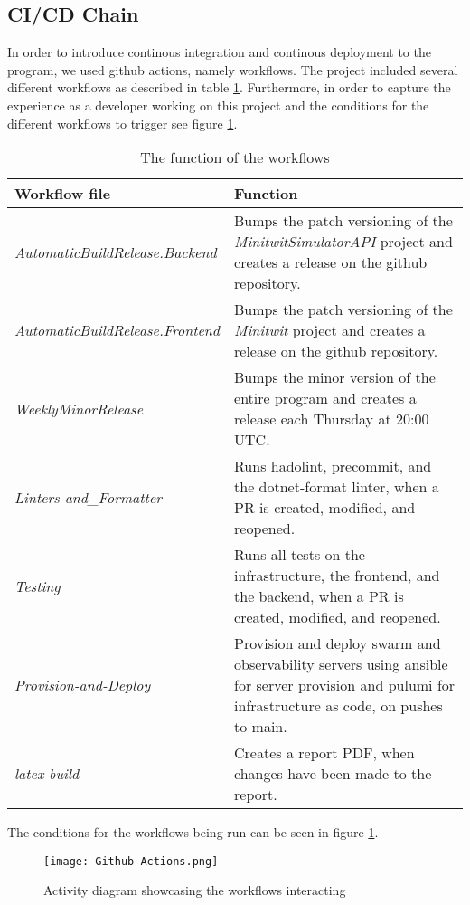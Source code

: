 \subsection{CI/CD Chain} %

In order to introduce continous integration and continous deployment to the program, we used github actions, namely workflows. The project included several different workflows as described in table \ref{tab:workflows}. Furthermore, in order to capture the experience as a developer working on this project and the conditions for the different workflows to trigger see figure \ref{fig:workflows}.

\begin{table}[]
    \centering
    \begin{tabular}{l|l}
        \textbf{Workflow file} & \textbf{Function}\\
        \hline
        \textit{AutomaticBuildRelease.Backend} &  Bumps the patch versioning of the \textit{MinitwitSimulatorAPI} project and creates a release on the github repository.\\
        \textit{AutomaticBuildRelease.Frontend} & Bumps the patch versioning of the \textit{Minitwit} project and creates a release on the github repository.\\
        \textit{WeeklyMinorRelease} & Bumps the minor version of the entire program and creates a release each Thursday at 20:00 UTC.\\
        \textit{Linters-and\_Formatter} & Runs hadolint, precommit, and the dotnet-format linter, when a PR is created, modified, and reopened.\\
        \textit{Testing} & Runs all tests on the infrastructure, the frontend, and the backend, when a PR is created, modified, and reopened.\\
        \textit{Provision-and-Deploy} & Provision and deploy swarm and observability servers using ansible for server provision and pulumi for infrastructure as code, on pushes to main.\\
        \textit{latex-build} & Creates a report PDF, when changes have been made to the report.
    \end{tabular}
    \caption{The function of the workflows}
    \label{tab:workflows}
\end{table}

The conditions for the workflows being run can be seen in figure \ref{fig:workflows}.

\begin{figure}
    \centering
    \texttt{[image: Github-Actions.png]}
    \caption{Activity diagram showcasing the workflows interacting }
    \label{fig:workflows}
\end{figure}
